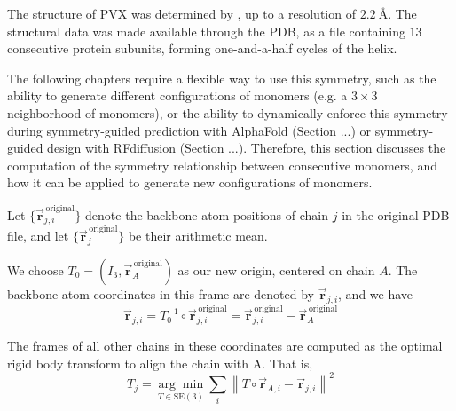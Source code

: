 The structure of PVX was determined by \cite{Grinzato2020}, up to a resolution of $\SI{2.2}{\angstrom}$. The structural data was made available through the PDB, as a file containing $13$ consecutive protein subunits, forming one-and-a-half cycles of the helix. 

The following chapters require a flexible way to use this symmetry, such as the ability to generate different configurations of monomers (e.g. a $3 \times 3$ neighborhood of monomers), or the ability to dynamically enforce this symmetry during symmetry-guided prediction with AlphaFold (Section ...) or symmetry-guided design with RFdiffusion (Section ...). Therefore, this section discusses the computation of the symmetry relationship between consecutive monomers, and how it can be applied to generate new configurations of monomers.

Let $\{\vec{\mathbf{r}}_{j,i}^{\,\text{original}}\}$ denote the backbone atom positions of chain $j$ in the original PDB file, and let $\{\vec{\mathbf{r}}_{j}^{\,\text{original}}\}$ be their arithmetic mean. 

We choose $T_0 = (I_3, \vec{\mathbf{r}}_A^{\,\text{original}})$ as our new origin, centered on chain $A$. The backbone atom coordinates in this frame are denoted by $\vec{\mathbf{r}}_{j,i}$, and we have
\begin{equation}
    \vec{\mathbf{r}}_{j,i} = T_0^{-1} \circ \vec{\mathbf{r}}_{j,i}^{\,\text{original}} = \vec{\mathbf{r}}_{j,i}^{\,\text{original}} - \vec{\mathbf{r}}_{A}^{\,\text{original}}
\end{equation}

The frames of all other chains in these coordinates are computed as the optimal rigid body transform to align the chain with A. That is,
\begin{equation}
T_j = \underset{T \in \mathrm{SE}(3)}{\arg\min} \sum_i \left\| T\circ\vec{\mathbf{r}}_{A,i} - \vec{\mathbf{r}}_{j,i} \right\|^2
\end{equation}

